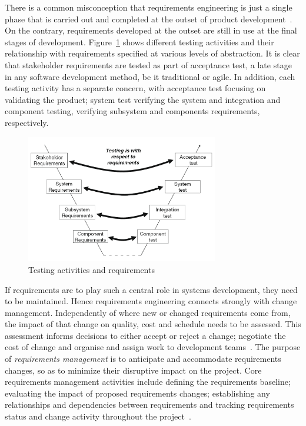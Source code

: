 \documentclass[dissertation,final]{softeng}
\begin{document}
There is a common misconception that requirements engineering is just a single phase that is carried out and completed at the outset of product development~\citep{Hull2011}. On the contrary, requirements developed at the outset are still in use at the final stages of development. Figure~\ref{fig:testsandreqs} shows different testing activities and their relationship with requirements specified at various levels of abstraction. It is clear that stakeholder requirements are tested as part of acceptance test, a late stage in any software development method, be it traditional or agile. In addition, each testing activity has a separate concern, with acceptance test focusing on validating the product; system test verifying the system and integration and component testing, verifying subsystem and components requirements, respectively.
\begin{figure}[h]
\includegraphics[width=0.75\textwidth]{RoleOfRequirementsInRelationToTesting}
\centering
\caption[Testing activities and requirements]{Testing activities and requirements~\citep{Hull2011}}
\label{fig:testsandreqs}
\end{figure}

If requirements are to play such a central role in systems development, they need to be maintained. Hence requirements engineering connects strongly with change management. Independently of where new or changed requirements come from, the impact of that change on quality, cost and schedule needs to be assessed. This assessment informs decisions to either accept or reject a change; negotiate the cost of change and organise and assign work to development teams~\citep{Hull2011}. The purpose of \emph{requirements management} is to anticipate and accommodate requirements changes, so as to minimize their disruptive impact on the project. Core requirements management activities include defining the requirements baseline; evaluating the impact of proposed requirements changes; establishing any relationships and dependencies between requirements and tracking requirements status and change activity throughout the project~\citep{Wiegers2013}.
\end{document}

